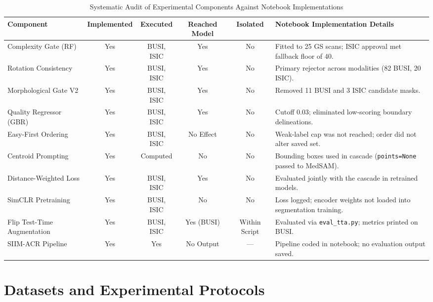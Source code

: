 \documentclass[journal,11pt,onecolumn,draftclsnofoot]{IEEEtran}
\begin{document}
\begin{table}[t]
\renewcommand{\arraystretch}{1.12}
\caption{Systematic Audit of Experimental Components Against Notebook Implementations}
\label{tab:audit}
\centering\footnotesize
\begin{tabularx}{\textwidth}{@{}p{3.2cm}cccc X@{}}
\toprule
Component & Implemented & Executed & Reached Model & Isolated & Notebook Implementation Details \\
\midrule
Complexity Gate (RF) & Yes & BUSI, ISIC & Yes & No & Fitted to 25 GS scans; ISIC approval met fallback floor of 40. \\
Rotation Consistency & Yes & BUSI, ISIC & Yes & No & Primary rejector across modalities (82 BUSI, 20 ISIC). \\
Morphological Gate V2 & Yes & BUSI, ISIC & Yes & No & Removed 11 BUSI and 3 ISIC candidate masks. \\
Quality Regressor (GBR) & Yes & BUSI, ISIC & Yes & No & Cutoff 0.03; eliminated low-scoring boundary delineations. \\
Easy-First Ordering & Yes & BUSI, ISIC & No Effect & No & Weak-label cap was not reached; order did not alter saved set. \\
Centroid Prompting & Yes & Computed & No & No & Bounding boxes used in cascade (\texttt{points=None} passed to MedSAM). \\
Distance-Weighted Loss & Yes & BUSI, ISIC & Yes & No & Evaluated jointly with the cascade in retrained models. \\
SimCLR Pretraining & Yes & BUSI, ISIC & No & No & Loss logged; encoder weights not loaded into segmentation training. \\
Flip Test-Time Augmentation & Yes & BUSI, ISIC & Yes (BUSI) & Within Script & Evaluated via \texttt{eval\_tta.py}; metrics printed on BUSI. \\
SIIM-ACR Pipeline & Yes & Yes & No Output & --- & Pipeline coded in notebook; no evaluation output saved. \\
\bottomrule
\end{tabularx}
\end{table}

\section{Datasets and Experimental Protocols}
\label{sec:data}
\end{document}
